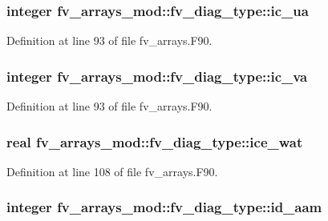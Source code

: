 \subsubsection[{ic\-\_\-ua}]{\setlength{\rightskip}{0pt plus 5cm}integer fv\-\_\-arrays\-\_\-mod\-::fv\-\_\-diag\-\_\-type\-::ic\-\_\-ua}\label{structfv__arrays__mod_1_1fv__diag__type_a54b1c4e81d0efba189d5a4ba22cc9586}


Definition at line 93 of file fv\-\_\-arrays.\-F90.

\subsubsection[{ic\-\_\-va}]{\setlength{\rightskip}{0pt plus 5cm}integer fv\-\_\-arrays\-\_\-mod\-::fv\-\_\-diag\-\_\-type\-::ic\-\_\-va}\label{structfv__arrays__mod_1_1fv__diag__type_a5d0238ef8c9714454fef513a0a142ad2}


Definition at line 93 of file fv\-\_\-arrays.\-F90.

\subsubsection[{ice\-\_\-wat}]{\setlength{\rightskip}{0pt plus 5cm}real fv\-\_\-arrays\-\_\-mod\-::fv\-\_\-diag\-\_\-type\-::ice\-\_\-wat}\label{structfv__arrays__mod_1_1fv__diag__type_a08c5978581db62bd5f165873975b82da}


Definition at line 108 of file fv\-\_\-arrays.\-F90.

\subsubsection[{id\-\_\-aam}]{\setlength{\rightskip}{0pt plus 5cm}integer fv\-\_\-arrays\-\_\-mod\-::fv\-\_\-diag\-\_\-type\-::id\-\_\-aam}\label{structfv__arrays__mod_1_1fv__diag__type_a615ce23d1327afa001d8cf6b212b6958}



